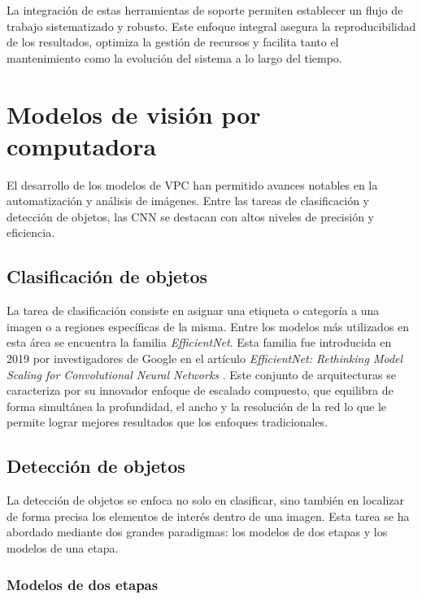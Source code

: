 La integración de estas herramientas de soporte permiten establecer un flujo de trabajo sistematizado y robusto. Este enfoque integral asegura la reproducibilidad de los resultados, optimiza la gestión de recursos y facilita tanto el mantenimiento como la evolución del sistema a lo largo del tiempo.

\section{Modelos de visión por computadora} \label{sec:modelosVisPC}

El desarrollo de los modelos de VPC han permitido avances notables en la automatización y análisis de imágenes. Entre las tareas de clasificación y detección de objetos, las CNN se destacan con altos niveles de precisión y eficiencia.

\subsection{Clasificación de objetos}

La tarea de clasificación consiste en asignar una etiqueta o categoría a una imagen o a regiones específicas de la misma. Entre los modelos más utilizados en esta área se encuentra la familia \textit{EfficientNet}. Esta familia fue introducida en 2019 por investigadores de Google en el artículo \textit{EfficientNet: Rethinking Model Scaling for Convolutional Neural Networks} \citep{tan_efficientnet_2020}. Este conjunto de arquitecturas se caracteriza por su innovador enfoque de escalado compuesto, que equilibra de forma simultánea la profundidad, el ancho y la resolución de la red lo que le permite lograr mejores resultados que los enfoques tradicionales.

\subsection{Detección de objetos}

La detección de objetos se enfoca no solo en clasificar, sino también en localizar de forma precisa los elementos de interés dentro de una imagen. Esta tarea se ha abordado mediante dos grandes paradigmas: los modelos de dos etapas y los modelos de una etapa.

\subsubsection{Modelos de dos etapas}

